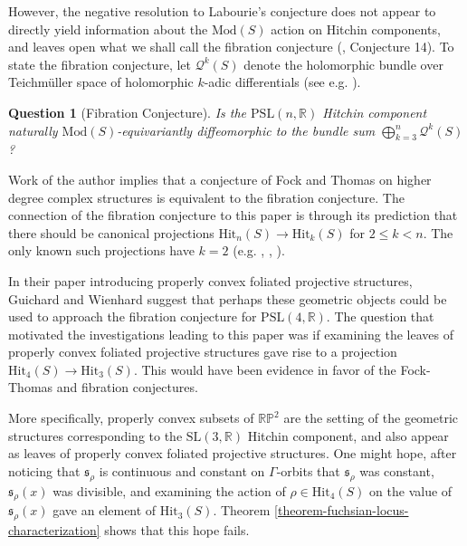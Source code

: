 \documentclass[12pt,a4paper]{amsart}
\theoremstyle{definition}
\theoremstyle{plain}
\newtheorem{question}[theorem]{Question}
\numberwithin{equation}{section}
\begin{document}
However, the negative resolution to Labourie's conjecture does not appear to directly yield information about the $\text{Mod}(S)$ action on Hitchin components, and leaves open what we shall call the fibration conjecture (\cite{wienhard2018Invitation}, Conjecture 14). To state the fibration conjecture, let $\mathcal{Q}^k(S)$ denote the holomorphic bundle over Teichm\"uller space of holomorphic $k$-adic differentials (see e.g. \cite{bers1961holomorphic}).

\begin{question}[Fibration Conjecture]
    Is the {\rm{$\text{PSL}(n,\mathbb{R})$}} Hitchin component naturally {\rm{$\text{Mod}(S)$}}-equivariantly diffeomorphic to the bundle sum $\bigoplus_{k=3}^n \mathcal{Q}^k(S)$?
\end{question}

Work of the author \cite{nolte2022canonical} implies that a conjecture of Fock and Thomas on higher degree complex structures \cite{fock2021higher} is equivalent to the fibration conjecture. The connection of the fibration conjecture to this paper is through its prediction that there should be canonical projections $\text{Hit}_n(S) \to \text{Hit}_k(S)$ for $2 \leq k < n$. The only known such projections have $k=2$ (e.g. \cite{labourie2007flat}, \cite{loftin2001affine}, \cite{sapirHensel2021projection}).

In their paper \cite{guichard2008convex} introducing properly convex foliated projective structures, Guichard and Wienhard suggest that perhaps these geometric objects could be used to approach the fibration conjecture for $\text{PSL}(4,\mathbb{R})$. The question that motivated the investigations leading to this paper was if examining the leaves of properly convex foliated projective structures gave rise to a projection $\text{Hit}_4(S) \to \text{Hit}_3(S)$. This would have been evidence in favor of the Fock-Thomas and fibration conjectures.

More specifically, properly convex subsets of $\mathbb{RP}^2$ are the setting of the geometric structures corresponding to the $\text{SL}(3, \mathbb{R})$ Hitchin component, and also appear as leaves of properly convex foliated projective structures. One might hope, after noticing that $\mathfrak{s}_\rho$ is continuous and constant on $\Gamma$-orbits that $\mathfrak{s}_\rho$ was constant, $\mathfrak{s}_\rho(x)$ was divisible, and examining the action of $\rho \in \text{Hit}_4(S)$ on the value of $\mathfrak{s}_\rho(x)$ gave an element of $\text{Hit}_3(S)$. Theorem \ref{theorem-fuchsian-locus-characterization} shows that this hope fails.
  \vspace{0.25cm}
\end{document}
